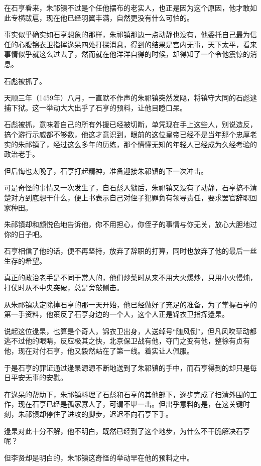 \begin{multicols}{\theparacolNo}
		在石亨看来，朱祁镇不过是个任他摆布的老实人，也正是因为这个原因，他才敢如此专横跋扈，现在他已经羽翼丰满，自然更没有什么可怕的。

		事实似乎确实如石亨想象的那样，朱祁镇那边一点动静也没有，他委托自己最为信任的心腹锦衣卫指挥逯杲四处打探消息，得到的结果是宫内无事，天下太平，看来事情似乎就这么过去了，然而就在他洋洋自得的时候，却得知了一个令他震惊的消息。

		石彪被抓了。

		天顺三年（1459年）八月，一直默不作声的朱祁镇突然发飚，将镇守大同的石彪逮捕下狱。这一举动大大出乎了石亨的预料，让他目瞪口呆。

		石彪被抓，意味着自己的所有外援已经被切断，单凭现在手上这些人，别说造反，搞个游行示威都不够数，他这才意识到，眼前的这位皇帝已经不是当年那个忠厚老实的朱祁镇了，经过这么多年的历练，那个懵懂无知的年轻人已经成为久经考验的政治老手。

		但后悔也太晚了，石亨打起精神，准备迎接朱祁镇的下一次冲击。

		可是奇怪的事情又一次发生了，自石彪入狱后，朱祁镇又没有了动静，石亨搞不清楚对方到底想干什么，便上书表示自己对侄子犯罪负有领导责任，要求罢官辞职回家种田。

		朱祁镇却和颜悦色地告诉他，你不用担心，你侄子的事情与你无关，放心大胆地过你的日子吧。

		石亨相信了他的话，便不再坚持，放弃了辞职的打算，同时也放弃了他的最后一丝生存的希望。

		真正的政治老手是不同于常人的，他们炒菜时从来不用大火爆炒，只用小火慢炖，打仗时从不中央突破，总是旁敲侧击。

		从朱祁镇决定除掉石亨的那一天开始，他已经做好了充足的准备，为了掌握石亨的第一手资料，他策反了石亨身边的一个人，这个人正是锦衣卫指挥逯杲。

		说起这位逯杲，也算是个奇人，锦衣卫出身，人送绰号“随风倒”，但凡风吹草动都逃不过他的眼睛，反应极其之快，北京保卫战有他，夺门之变有他，整徐有贞有他，现在对付石亨，他又毅然站在了第一线。着实让人佩服。

		于是石亨的罪证通过逯杲源源不断地送到了朱祁镇的手中，而石亨得到的却只是每日平安无事的安慰。

		在逯杲的帮助下，朱祁镇料理了石彪和石亨的其他部下，逐步完成了扫清外围的工作，现在石亨已经是孤家寡人了，可谓不堪一击。但出乎意料的是，在这关键时刻，朱祁镇却停住了进攻的脚步，迟迟不向石亨下手。

		逯杲对此十分不解，他不明白，既然已经到了这个地步，为什么不干脆解决石亨呢？

		但李贤却是明白的，朱祁镇这奇怪的举动早在他的预料之中。


\end{multicols}
